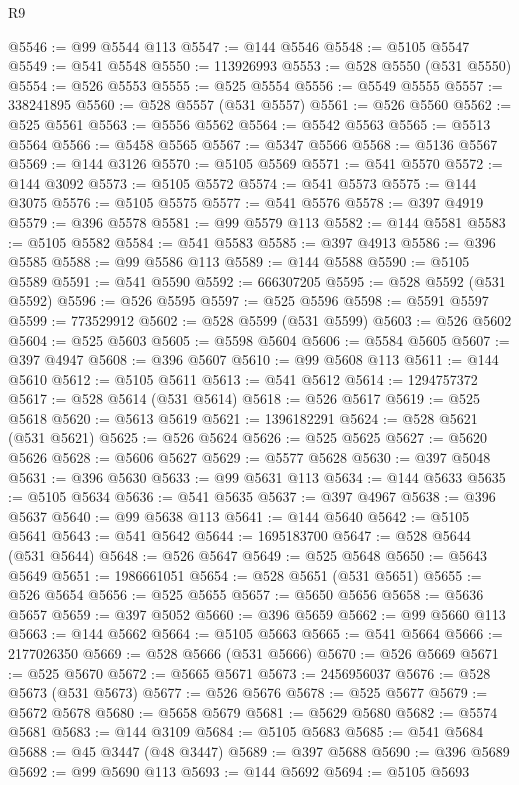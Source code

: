 \begin{lexlean}{R9}
\begin{coremodule}
@5546 := @99 @5544 @113
@5547 := @144 @5546
@5548 := @5105 @5547
@5549 := @541 @5548
@5550 := 113926993
@5553 := @528 @5550 (@531 @5550)
@5554 := @526 @5553
@5555 := @525 @5554
@5556 := @5549 @5555
@5557 := 338241895
@5560 := @528 @5557 (@531 @5557)
@5561 := @526 @5560
@5562 := @525 @5561
@5563 := @5556 @5562
@5564 := @5542 @5563
@5565 := @5513 @5564
@5566 := @5458 @5565
@5567 := @5347 @5566
@5568 := @5136 @5567
@5569 := @144 @3126
@5570 := @5105 @5569
@5571 := @541 @5570
@5572 := @144 @3092
@5573 := @5105 @5572
@5574 := @541 @5573
@5575 := @144 @3075
@5576 := @5105 @5575
@5577 := @541 @5576
@5578 := @397 @4919
@5579 := @396 @5578
@5581 := @99 @5579 @113
@5582 := @144 @5581
@5583 := @5105 @5582
@5584 := @541 @5583
@5585 := @397 @4913
@5586 := @396 @5585
@5588 := @99 @5586 @113
@5589 := @144 @5588
@5590 := @5105 @5589
@5591 := @541 @5590
@5592 := 666307205
@5595 := @528 @5592 (@531 @5592)
@5596 := @526 @5595
@5597 := @525 @5596
@5598 := @5591 @5597
@5599 := 773529912
@5602 := @528 @5599 (@531 @5599)
@5603 := @526 @5602
@5604 := @525 @5603
@5605 := @5598 @5604
@5606 := @5584 @5605
@5607 := @397 @4947
@5608 := @396 @5607
@5610 := @99 @5608 @113
@5611 := @144 @5610
@5612 := @5105 @5611
@5613 := @541 @5612
@5614 := 1294757372
@5617 := @528 @5614 (@531 @5614)
@5618 := @526 @5617
@5619 := @525 @5618
@5620 := @5613 @5619
@5621 := 1396182291
@5624 := @528 @5621 (@531 @5621)
@5625 := @526 @5624
@5626 := @525 @5625
@5627 := @5620 @5626
@5628 := @5606 @5627
@5629 := @5577 @5628
@5630 := @397 @5048
@5631 := @396 @5630
@5633 := @99 @5631 @113
@5634 := @144 @5633
@5635 := @5105 @5634
@5636 := @541 @5635
@5637 := @397 @4967
@5638 := @396 @5637
@5640 := @99 @5638 @113
@5641 := @144 @5640
@5642 := @5105 @5641
@5643 := @541 @5642
@5644 := 1695183700
@5647 := @528 @5644 (@531 @5644)
@5648 := @526 @5647
@5649 := @525 @5648
@5650 := @5643 @5649
@5651 := 1986661051
@5654 := @528 @5651 (@531 @5651)
@5655 := @526 @5654
@5656 := @525 @5655
@5657 := @5650 @5656
@5658 := @5636 @5657
@5659 := @397 @5052
@5660 := @396 @5659
@5662 := @99 @5660 @113
@5663 := @144 @5662
@5664 := @5105 @5663
@5665 := @541 @5664
@5666 := 2177026350
@5669 := @528 @5666 (@531 @5666)
@5670 := @526 @5669
@5671 := @525 @5670
@5672 := @5665 @5671
@5673 := 2456956037
@5676 := @528 @5673 (@531 @5673)
@5677 := @526 @5676
@5678 := @525 @5677
@5679 := @5672 @5678
@5680 := @5658 @5679
@5681 := @5629 @5680
@5682 := @5574 @5681
@5683 := @144 @3109
@5684 := @5105 @5683
@5685 := @541 @5684
@5688 := @45 @3447 (@48 @3447)
@5689 := @397 @5688
@5690 := @396 @5689
@5692 := @99 @5690 @113
@5693 := @144 @5692
@5694 := @5105 @5693

\end{coremodule}
\end{lexlean}
